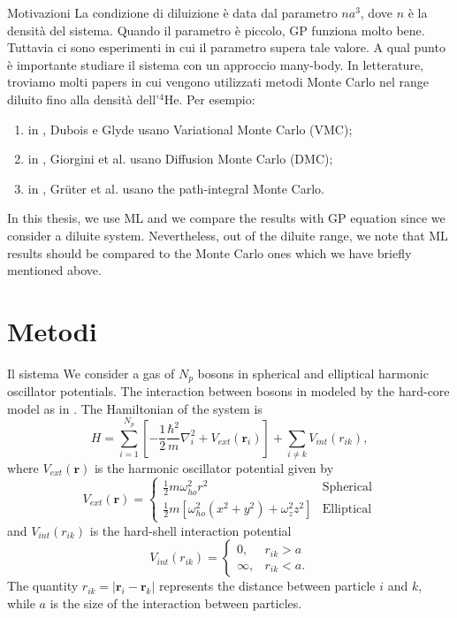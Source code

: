 \documentclass[10pt]{beamer}
\begin{document}
\begin{frame}[fragile]{Motivazioni}
	La condizione di diluizione è data dal parametro $na^3$, dove $n$ è la densità del sistema.
	Quando il parametro è piccolo, GP funziona molto bene. Tuttavia ci sono esperimenti in cui il parametro supera tale valore. A qual punto è importante studiare il sistema con un approccio many-body. In letterature, troviamo molti papers in cui vengono utilizzati metodi Monte Carlo nel range diluito fino alla densità dell'$^4$He. Per esempio:
	\begin{enumerate}
		\item in \cite{vmcarticle}, Dubois e Glyde usano Variational Monte Carlo (VMC);
		\item in \cite{Giorgini}, Giorgini et al. usano Diffusion Monte Carlo (DMC);
		\item in \cite{Gruter}, Gr\"{u}ter et al. usano the path-integral Monte Carlo.
	\end{enumerate}  
	In this thesis, we use ML and we compare the results with GP equation since we consider a diluite system. Nevertheless, out of the diluite range, we note that ML results should be compared to the Monte Carlo ones which we have briefly mentioned above. 
\end{frame}


\section{Metodi}

\begin{frame}{Il sistema}
We consider a gas of $N_p$ bosons in spherical and elliptical harmonic oscillator potentials. The interaction between bosons in modeled by the hard-core model as in \cite{vmcarticle}. %
The Hamiltonian of the system is 
\begin{equation}
H = \sum_{i=1}^{N_p}\left[ -\frac{1}{2}\frac{\hbar^2}{m}\nabla_i^2 + V_{ext}(\textbf{r}_i) \right]+ \sum_{i \neq k} V_{int}(r_{ik}),
\label{eq_hamilton}
\end{equation}
where $V_{ext}(\textbf{r})$ is the harmonic oscillator potential given by
\begin{equation*}
V_{ext}(\textbf{r})=\begin{cases}
\frac{1}{2}m\omega_{ho}^2r^2 &\text{Spherical}\\
\frac{1}{2}m\left[ \omega_{ho}^2 \left(x^2 + y^2 \right) + \omega_z^2 z^2\right] &\text{Elliptical}
\end{cases}
\end{equation*}
and $V_{int}(r_{ik})$ is the hard-shell interaction potential 
\begin{equation*}
V_{int}(r_{ik}) = \begin{cases}
0, & r_{ik} > a \\
\infty, & r_{ik} < a.
\end{cases}
\end{equation*}
The quantity $r_{ik} = |\textbf{r}_i-\textbf{r}_k|$ represents the distance between particle $i$ and $k$, while $a$ is the size of the interaction between particles. 
\end{frame}
\end{document}

